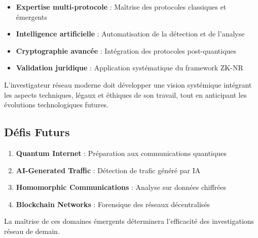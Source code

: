 \begin{itemize}
\item \textbf{Expertise multi-protocole} : Maîtrise des protocoles classiques et émergents
\item \textbf{Intelligence artificielle} : Automatisation de la détection et de l'analyse
\item \textbf{Cryptographie avancée} : Intégration des protocoles post-quantiques
\item \textbf{Validation juridique} : Application systématique du framework ZK-NR
\end{itemize}

L'investigateur réseau moderne doit développer une vision systémique intégrant les aspects techniques, légaux et éthiques de son travail, tout en anticipant les évolutions technologiques futures.

\subsection{Défis Futurs}

\begin{enumerate}
\item \textbf{Quantum Internet} : Préparation aux communications quantiques
\item \textbf{AI-Generated Traffic} : Détection de trafic généré par IA
\item \textbf{Homomorphic Communications} : Analyse sur données chiffrées
\item \textbf{Blockchain Networks} : Forensique des réseaux décentralisés
\end{enumerate}

La maîtrise de ces domaines émergents déterminera l'efficacité des investigations réseau de demain.